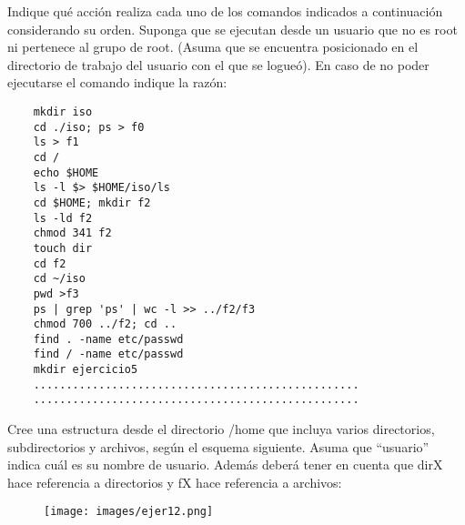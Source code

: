 \begin{questions}
\question Indique qué acción realiza cada uno de los comandos indicados a continuación considerando su orden. Suponga que se ejecutan desde un usuario que no es root ni pertenece al grupo de root. (Asuma que se encuentra posicionado en el directorio de trabajo del usuario con el que se logueó). En caso de no poder ejecutarse el comando indique la razón:
\begin{lstlisting}
	mkdir iso
	cd ./iso; ps > f0
	ls > f1
	cd /
	echo $HOME
	ls -l $> $HOME/iso/ls
	cd $HOME; mkdir f2
	ls -ld f2
	chmod 341 f2
	touch dir
	cd f2
	cd ~/iso
	pwd >f3
	ps | grep 'ps' | wc -l >> ../f2/f3
	chmod 700 ../f2; cd ..
	find . -name etc/passwd
	find / -name etc/passwd
	mkdir ejercicio5
	..................................................
	..................................................
\end{lstlisting}

\question Cree una estructura desde el directorio /home que incluya varios directorios, subdirectorios y archivos, según el esquema siguiente. Asuma que “usuario” indica cuál es su nombre de usuario. Además deberá tener en cuenta que dirX hace referencia a directorios y fX hace referencia a archivos:
\begin{figure}
	\centering
	\texttt{[image: images/ejer12.png]}
\end{figure}
\begin{parts}

\end{parts}
\end{questions}
